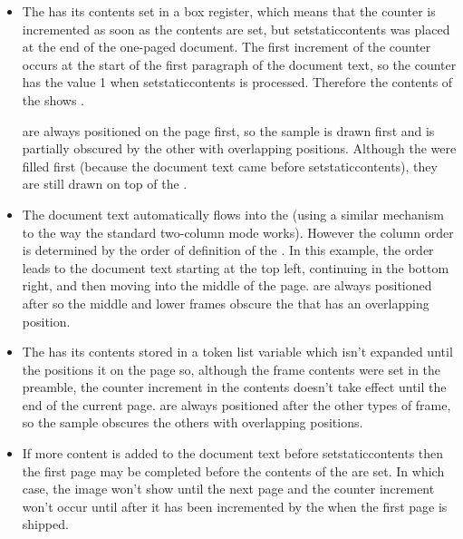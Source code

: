 \documentclass[fontsize=12pt]{scrbook}
\begin{document}
\begin{itemize}
\item The  has its contents set in a box register, which
means that the  counter is incremented as soon as the
contents are set, but \gls{setstaticcontents} was placed at the end
of the one-paged document. The first increment of the  counter occurs 
at the start of the first paragraph of the document text, so the
counter has the value 1 when \gls{setstaticcontents} is processed. 
Therefore the contents of the  shows .

 are always positioned on the page
first, so the sample  is drawn first and is
partially obscured by the other  with overlapping positions.
Although the  were filled first (because the
document text came before \gls{setstaticcontents}), they are still drawn on
top of the .

\item The document text automatically flows into the
 (using a similar mechanism to the way the
standard two-column mode works). However the column order is determined 
by the order of definition of the . In this
example, the order leads to the document text starting at the top
left, continuing in the bottom right, and then moving into the
middle of the page.  are always positioned after
 so the middle and lower frames obscure the
 that has an overlapping position.

\item The  has its contents stored in a token
list variable which isn't expanded until the 
positions it on the page so, although the frame contents were set in
the preamble, the  counter increment
in the  contents doesn't take effect until the
end of the current page.  are always positioned after the other
types of \gls{frame}, so the sample  obscures the
others with overlapping positions.

\item If more content is added to the document text before 
\gls{setstaticcontents} then the first page may be completed before the
contents of the  are set. In which case, the
 image won't show until the next page and the 
counter increment won't occur until after it has been incremented by
the  when the first page is shipped.

\end{itemize}
\end{document}
